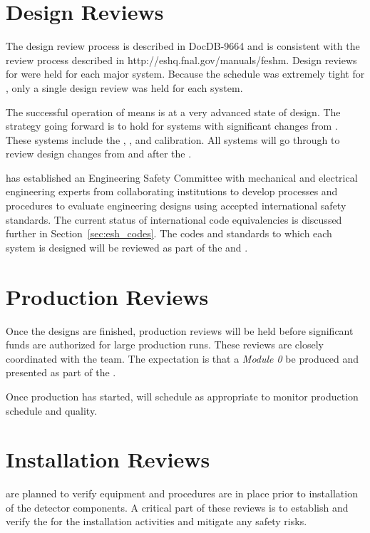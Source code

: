 \section{Design Reviews}

The  design review process is described in DocDB-9664 and
is consistent with the \fnal review process described in
http://eshq.fnal.gov/manuals/feshm. Design reviews for
 were held for each major system. Because the
schedule was extremely tight for , only a single
design review was held for each system.

The successful operation of  means  is at
a very advanced state of design. The strategy going forward is to hold
 for systems with significant changes from
. These systems include the , ,
 and calibration. All systems will go through 
to review design changes from  and  after
the .

 has established an Engineering Safety Committee with
mechanical and electrical engineering experts from collaborating
institutions to develop processes and procedures to evaluate
engineering designs using accepted international safety standards. The
current status of international code equivalencies is discussed
further in Section~\ref{sec:esh_codes}. The codes and standards to
which each system is designed will be reviewed as part of the
 and .

\section{Production Reviews}

Once the designs are finished, production reviews will be held before
significant funds are authorized for large production runs. These
reviews are closely coordinated with the  team. The
expectation is that a \textit{Module 0} be produced and presented as
part of the .

Once production has started,  will schedule 
as appropriate to monitor production schedule and quality.

\section{Installation Reviews}

 are planned to verify equipment and procedures are in
place prior to installation of the detector components. A critical
part of these reviews is to establish and verify the  for
the installation activities and mitigate any safety risks.

